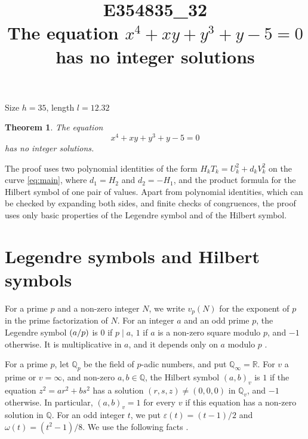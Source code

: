\documentclass[11pt]{article}
\title{\textbf{E354835\_32}\\[4pt] {\Large The equation $x^{4}+xy+y^{3}+y-5=0$ has no integer solutions}}
\author{}
\date{}
\newtheorem{theorem}{Theorem}
\newcommand{\Q}{\mathbb{Q}}
\newcommand{\leg}[2]{\mathchoice{\biggl(\dfrac{#1}{#2}\biggr)}{(#1/#2)}{(#1/#2)}{(#1/#2)}}
\begin{document}
\maketitle
\vspace{-8ex}
\begin{center}
Size $h=35$, length $l=12.32$
\end{center}

\begin{theorem}\label{thm:main}
The equation
\begin{equation}\label{eq:main}
x^{4}+xy+y^{3}+y-5=0
\end{equation}
has no integer solutions.
\end{theorem}

The proof uses two polynomial identities of the form $H_kT_k=U_k^2+d_kV_k^2$ on the curve \eqref{eq:main}, where $d_{1}=H_{2}$ and $d_{2}=-H_{1}$, and the product formula for the Hilbert symbol of one pair of values. Apart from polynomial identities, which can be checked by expanding both sides, and finite checks of congruences, the proof uses only basic properties of the Legendre symbol and of the Hilbert symbol.

\section{Legendre symbols and Hilbert symbols}

For a prime $p$ and a non-zero integer $N$, we write $v_p(N)$ for the exponent of $p$ in the prime factorization of $N$. For an integer $a$ and an odd prime $p$, the Legendre symbol $\leg{a}{p}$ is $0$ if $p\mid a$, $1$ if $a$ is a non-zero square modulo $p$, and $-1$ otherwise. It is multiplicative in $a$, and it depends only on $a$ modulo $p$ \cite[Chapter~5]{IR}.

For a prime $p$, let $\Q_p$ be the field of $p$-adic numbers, and put $\Q_\infty=\mathbb R$. For $v$ a prime or $v=\infty$, and non-zero $a,b\in\Q$, the Hilbert symbol $(a,b)_v$ is $1$ if the equation $z^2=ar^2+bs^2$ has a solution $(r,s,z)\neq(0,0,0)$ in $\Q_v$, and $-1$ otherwise. In particular, $(a,b)_v=1$ for every $v$ if this equation has a non-zero solution in $\Q$. For an odd integer $t$, we put $\varepsilon(t)=(t-1)/2$ and $\omega(t)=(t^2-1)/8$. We use the following facts \cite[Chapter~III, Proposition~2 and Theorems~1 and~3]{Se}.
\end{document}
